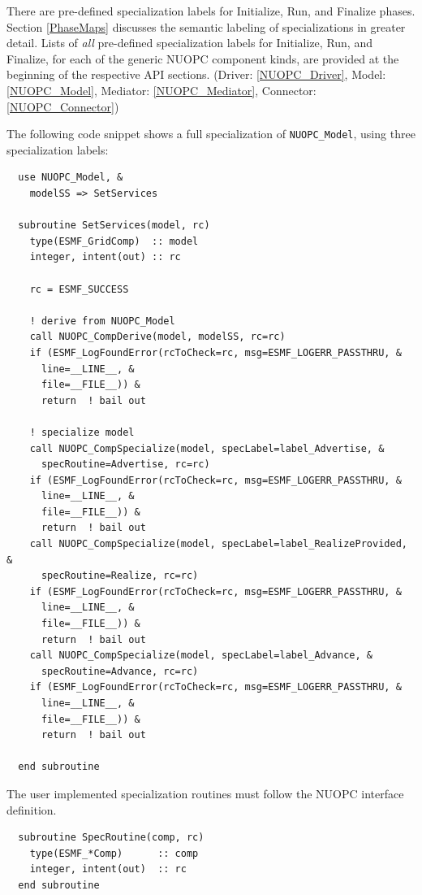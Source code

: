 There are pre-defined specialization labels for Initialize, Run, and Finalize phases. Section \ref{PhaseMaps} discusses the semantic labeling of specializations in greater detail. Lists of {\em all} pre-defined specialization labels for Initialize, Run, and Finalize, for each of the generic NUOPC component kinds, are provided at the beginning of the respective API sections. (Driver: \ref{NUOPC_Driver}, Model: \ref{NUOPC_Model}, Mediator: \ref{NUOPC_Mediator}, Connector: \ref{NUOPC_Connector})

The following code snippet shows a full specialization of {\tt NUOPC\_Model}, using three specialization labels:

\begin{verbatim}
  use NUOPC_Model, &
    modelSS => SetServices

  subroutine SetServices(model, rc)
    type(ESMF_GridComp)  :: model
    integer, intent(out) :: rc

    rc = ESMF_SUCCESS

    ! derive from NUOPC_Model
    call NUOPC_CompDerive(model, modelSS, rc=rc)
    if (ESMF_LogFoundError(rcToCheck=rc, msg=ESMF_LOGERR_PASSTHRU, &
      line=__LINE__, &
      file=__FILE__)) &
      return  ! bail out

    ! specialize model
    call NUOPC_CompSpecialize(model, specLabel=label_Advertise, &
      specRoutine=Advertise, rc=rc)
    if (ESMF_LogFoundError(rcToCheck=rc, msg=ESMF_LOGERR_PASSTHRU, &
      line=__LINE__, &
      file=__FILE__)) &
      return  ! bail out
    call NUOPC_CompSpecialize(model, specLabel=label_RealizeProvided, &
      specRoutine=Realize, rc=rc)
    if (ESMF_LogFoundError(rcToCheck=rc, msg=ESMF_LOGERR_PASSTHRU, &
      line=__LINE__, &
      file=__FILE__)) &
      return  ! bail out
    call NUOPC_CompSpecialize(model, specLabel=label_Advance, &
      specRoutine=Advance, rc=rc)
    if (ESMF_LogFoundError(rcToCheck=rc, msg=ESMF_LOGERR_PASSTHRU, &
      line=__LINE__, &
      file=__FILE__)) &
      return  ! bail out

  end subroutine
\end{verbatim}

The user implemented specialization routines must follow the NUOPC interface definition.

\begin{verbatim}
  subroutine SpecRoutine(comp, rc)
    type(ESMF_*Comp)      :: comp
    integer, intent(out)  :: rc
  end subroutine
\end{verbatim}

